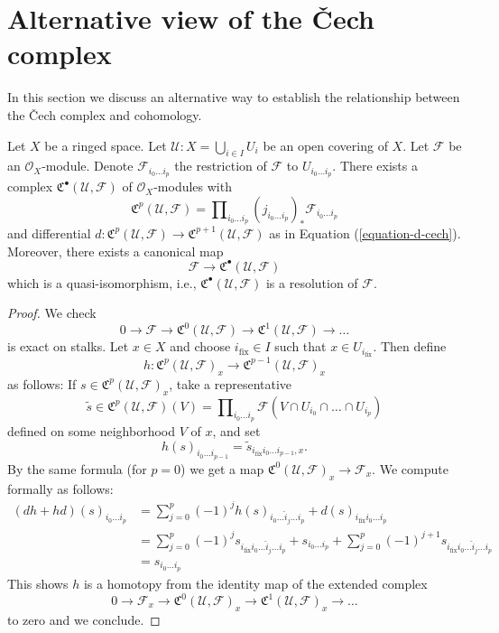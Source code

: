 \section{Alternative view of the {\v C}ech complex}
\label{section-locally-finite-cech}

\noindent
In this section we discuss an alternative way to establish the relationship
between the {\v C}ech complex and cohomology.

\begin{lemma}
\label{lemma-covering-resolution}
Let $X$ be a ringed space. Let $\mathcal{U} : X = \bigcup_{i \in I} U_i$
be an open covering of $X$. Let $\mathcal{F}$ be an $\mathcal{O}_X$-module.
Denote $\mathcal{F}_{i_0 \ldots i_p}$ the restriction of
$\mathcal{F}$ to $U_{i_0 \ldots i_p}$. There exists a complex
${\mathfrak C}^\bullet(\mathcal{U}, \mathcal{F})$
of $\mathcal{O}_X$-modules with
$$
{\mathfrak C}^p(\mathcal{U}, \mathcal{F}) =
\prod\nolimits_{i_0 \ldots i_p}
(j_{i_0 \ldots i_p})_* \mathcal{F}_{i_0 \ldots i_p}
$$
and differential
$d : {\mathfrak C}^p(\mathcal{U}, \mathcal{F})
\to {\mathfrak C}^{p + 1}(\mathcal{U}, \mathcal{F})$
as in Equation (\ref{equation-d-cech}). Moreover, there exists a canonical
map
$$
\mathcal{F} \to {\mathfrak C}^\bullet(\mathcal{U}, \mathcal{F})
$$
which is a quasi-isomorphism, i.e.,
${\mathfrak C}^\bullet(\mathcal{U}, \mathcal{F})$
is a resolution of $\mathcal{F}$.
\end{lemma}

\begin{proof}
We check
$$
0 \to \mathcal{F} \to \mathfrak{C}^0(\mathcal{U}, \mathcal{F}) \to
\mathfrak{C}^1(\mathcal{U}, \mathcal{F}) \to  \ldots
$$
is exact on stalks. Let $x \in X$ and choose $i_{\text{fix}} \in I$
such that $x \in U_{i_{\text{fix}}}$. Then define
$$
h : \mathfrak{C}^p(\mathcal{U}, \mathcal{F})_x
\to \mathfrak{C}^{p - 1}(\mathcal{U}, \mathcal{F})_x
$$
as follows: If $s \in \mathfrak{C}^p(\mathcal{U}, \mathcal{F})_x$, take
a representative
$$
\widetilde{s} \in
\mathfrak{C}^p(\mathcal{U}, \mathcal{F})(V) =
\prod\nolimits_{i_0 \ldots i_p}
\mathcal{F}(V \cap U_{i_0} \cap \ldots \cap U_{i_p})
$$
defined on some neighborhood $V$ of $x$, and set
$$
h(s)_{i_0 \ldots i_{p - 1}} =
\widetilde{s}_{i_{\text{fix}} i_0 \ldots i_{p - 1}, x}.
$$
By the same formula (for $p = 0$) we get a map
$\mathfrak{C}^{0}(\mathcal{U},\mathcal{F})_x \to \mathcal{F}_x$.
We compute formally as follows:
\begin{align*}
(dh + hd)(s)_{i_0 \ldots i_p}
& =
\sum\nolimits_{j = 0}^p
(-1)^j
h(s)_{i_0 \ldots \hat i_j \ldots i_p}
+
d(s)_{i_{\text{fix}} i_0 \ldots i_p}\\
& =
\sum\nolimits_{j = 0}^p
(-1)^j
s_{i_{\text{fix}} i_0 \ldots \hat i_j \ldots i_p}
+
s_{i_0 \ldots i_p}
+
\sum\nolimits_{j = 0}^p
(-1)^{j + 1}
s_{i_{\text{fix}} i_0 \ldots \hat i_j \ldots i_p} \\
& =
s_{i_0 \ldots i_p}
\end{align*}
This shows $h$ is a homotopy from the identity map of
the extended complex
$$
0 \to \mathcal{F}_x \to \mathfrak{C}^0(\mathcal{U}, \mathcal{F})_x
\to \mathfrak{C}^1(\mathcal{U}, \mathcal{F})_x \to \ldots
$$
to zero and we conclude.
\end{proof}

